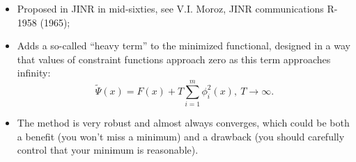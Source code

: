 \begin{itemize}
\item Proposed in JINR in mid-sixties, see V.I. Moroz, JINR communications R-1958 (1965);
\item Adds a so-called ``heavy term'' to the minimized functional, designed in a way that values of constraint functions approach zero as this term approaches infinity:
\[
\tilde{\Psi}(x) = F(x) + T\sum_{i=1}^{m}\phi_i^2(x),~T \rightarrow \infty.
\]
\item The method is very robust and almost always converges, which could be both a benefit (you won't miss a minimum) and a drawback (you should carefully control that your minimum is reasonable).
\end{itemize}
